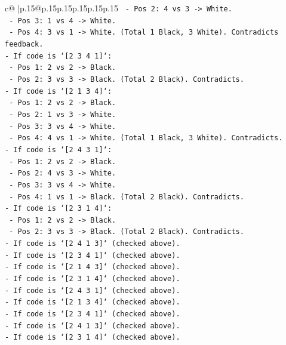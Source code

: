 \documentclass{article}
\begin{document}
{\begin{supertabular}{c@{$\;$}|p{.15\linewidth}@{}p{.15\linewidth}p{.15\linewidth}p{.15\linewidth}p{.15\linewidth}p{.15\linewidth}}
{{{\texttt{  {-} Pos 2: 4 vs 3 {-}> White.} \\
\texttt{  {-} Pos 3: 1 vs 4 {-}> White.} \\
\texttt{  {-} Pos 4: 3 vs 1 {-}> White. (Total 1 Black, 3 White). Contradicts feedback.} \\
\texttt{{-} If code is `{[}2 3 4 1{]}`:} \\
\texttt{  {-} Pos 1: 2 vs 2 {-}> Black.} \\
\texttt{  {-} Pos 2: 3 vs 3 {-}> Black. (Total 2 Black). Contradicts.} \\
\texttt{{-} If code is `{[}2 1 3 4{]}`:} \\
\texttt{  {-} Pos 1: 2 vs 2 {-}> Black.} \\
\texttt{  {-} Pos 2: 1 vs 3 {-}> White.} \\
\texttt{  {-} Pos 3: 3 vs 4 {-}> White.} \\
\texttt{  {-} Pos 4: 4 vs 1 {-}> White. (Total 1 Black, 3 White). Contradicts.} \\
\texttt{{-} If code is `{[}2 4 3 1{]}`:} \\
\texttt{  {-} Pos 1: 2 vs 2 {-}> Black.} \\
\texttt{  {-} Pos 2: 4 vs 3 {-}> White.} \\
\texttt{  {-} Pos 3: 3 vs 4 {-}> White.} \\
\texttt{  {-} Pos 4: 1 vs 1 {-}> Black. (Total 2 Black). Contradicts.} \\
\texttt{{-} If code is `{[}2 3 1 4{]}`:} \\
\texttt{  {-} Pos 1: 2 vs 2 {-}> Black.} \\
\texttt{  {-} Pos 2: 3 vs 3 {-}> Black. (Total 2 Black). Contradicts.} \\
\texttt{{-} If code is `{[}2 4 1 3{]}` (checked above).} \\
\texttt{{-} If code is `{[}2 3 4 1{]}` (checked above).} \\
\texttt{{-} If code is `{[}2 1 4 3{]}` (checked above).} \\
\texttt{{-} If code is `{[}2 3 1 4{]}` (checked above).} \\
\texttt{{-} If code is `{[}2 4 3 1{]}` (checked above).} \\
\texttt{{-} If code is `{[}2 1 3 4{]}` (checked above).} \\
\texttt{{-} If code is `{[}2 3 4 1{]}` (checked above).} \\
\texttt{{-} If code is `{[}2 4 1 3{]}` (checked above).} \\
\texttt{{-} If code is `{[}2 3 1 4{]}` (checked above).} \\
}}}
\end{supertabular}}
\end{document}
